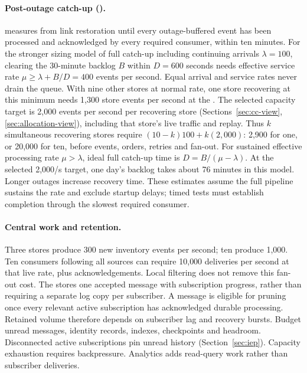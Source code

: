 \paragraph{Post-outage catch-up ().}
 measures from link restoration until every outage-buffered event has
been processed and acknowledged by every required consumer, within ten minutes.
For the stronger sizing model of full catch-up including continuing arrivals
\(\lambda=100\), clearing the 30-minute backlog \(B\)
within \(D=600\) seconds needs effective service rate
\(\mu\geq\lambda+B/D=400\) events per second. Equal arrival and service rates never
drain the queue. With nine other stores at normal rate, one store recovering at this
minimum needs 1{,}300 store events per second at the \DC.
The selected capacity target is 2{,}000 events per second per recovering store
(Sections~\ref{sec:cc-view}, \ref{sec:allocation-view}), including that store's live
traffic and replay. Thus \(k\) simultaneous recovering stores require
\((10-k)100+k(2{,}000)\): 2{,}900 for one, or 20{,}000 for ten, before \DC events,
orders, retries and fan-out.
For sustained effective processing rate \(\mu>\lambda\), ideal full catch-up time is
\(D=B/(\mu-\lambda)\). At the selected 2{,}000/s target, one day's backlog takes about
76 minutes in this model. Longer outages increase recovery time. These estimates
assume the full pipeline sustains the rate and exclude startup delays; timed tests
must establish completion through the slowest required consumer.

\paragraph{Central work and retention.}
Three stores produce 300 new inventory events per second; ten produce 1{,}000.
Ten consumers following all sources can require 10{,}000 deliveries per second at
that live rate, plus acknowledgements. Local filtering does not remove this fan-out
cost. The \CFE stores one accepted message with subscription progress, rather than
requiring a separate log copy per subscriber. A message is eligible for pruning once
every relevant active subscription has acknowledged durable processing. Retained
volume therefore depends on subscriber lag and recovery bursts. Budget unread messages,
identity records, indexes, checkpoints and headroom. Disconnected active subscriptions
pin unread history (Section~\ref{sec:iep}). Capacity exhaustion requires backpressure.
Analytics adds read-query work rather than subscriber deliveries.

